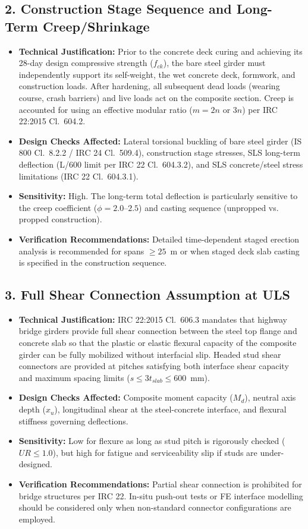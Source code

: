 \documentclass[12pt,a4paper]{report}
\numberwithin{table}{chapter}
\numberwithin{figure}{chapter}
\begin{document}
\subsection{2. Construction Stage Sequence and Long-Term Creep/Shrinkage}
\begin{itemize}
    \item \textbf{Technical Justification:} Prior to the concrete deck curing and achieving its 28-day design compressive strength ($f_{ck}$), the bare steel girder must independently support its self-weight, the wet concrete deck, formwork, and construction loads. After hardening, all subsequent dead loads (wearing course, crash barriers) and live loads act on the composite section. Creep is accounted for using an effective modular ratio ($m = 2n$ or $3n$) per IRC 22:2015 Cl.~604.2.
    \item \textbf{Design Checks Affected:} Lateral torsional buckling of bare steel girder (IS 800 Cl.~8.2.2 / IRC 24 Cl.~509.4), construction stage stresses, SLS long-term deflection (L/600 limit per IRC 22 Cl.~604.3.2), and SLS concrete/steel stress limitations (IRC 22 Cl.~604.3.1).
    \item \textbf{Sensitivity:} High. The long-term total deflection is particularly sensitive to the creep coefficient ($\phi = 2.0$--$2.5$) and casting sequence (unpropped vs. propped construction).
    \item \textbf{Verification Recommendations:} Detailed time-dependent staged erection analysis is recommended for spans $\ge 25$~m or when staged deck slab casting is specified in the construction sequence.
\end{itemize}

\subsection{3. Full Shear Connection Assumption at ULS}
\begin{itemize}
    \item \textbf{Technical Justification:} IRC 22:2015 Cl.~606.3 mandates that highway bridge girders provide full shear connection between the steel top flange and concrete slab so that the plastic or elastic flexural capacity of the composite girder can be fully mobilized without interfacial slip. Headed stud shear connectors are provided at pitches satisfying both interface shear capacity and maximum spacing limits ($s \le 3 t_{slab} \le 600$~mm).
    \item \textbf{Design Checks Affected:} Composite moment capacity ($M_d$), neutral axis depth ($x_u$), longitudinal shear at the steel-concrete interface, and flexural stiffness governing deflections.
    \item \textbf{Sensitivity:} Low for flexure as long as stud pitch is rigorously checked ($UR \le 1.0$), but high for fatigue and serviceability slip if studs are under-designed.
    \item \textbf{Verification Recommendations:} Partial shear connection is prohibited for bridge structures per IRC 22. In-situ push-out tests or FE interface modelling should be considered only when non-standard connector configurations are employed.
\end{itemize}
\end{document}
